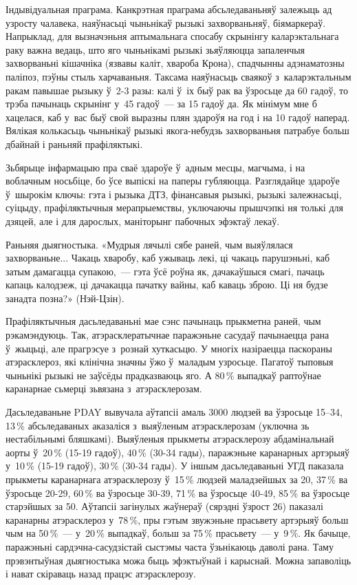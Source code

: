 Індывідуальная праграма. Канкрэтная праграма абсьледаваньняў залежыць ад узросту чалавека, наяўнасьці чыньнікаў рызыкі захворваньняў, біямаркераў. Напрыклад, для вызначэньня аптымальнага спосабу скрынінгу каларэктальнага раку важна ведаць, што яго чыньнікамі рызыкі зьяўляюцца запаленчыя захворваньні кішачніка (язвавы каліт, хвароба Крона), спадчынны адэнаматозны паліпоз, пэўны стыль харчаваньня. Таксама наяўнасьць сваякоў з~каларэктальным ракам павышае рызыку ў~2-3 разы: калі ў~іх быў рак ва ўзросьце да 60 гадоў, то трэба пачынаць скрынінг у~45 гадоў~--- за 15 гадоў да. Як мінімум мне б хацелася, каб у~вас быў свой выразны плян здароўя на год і на 10 гадоў наперад. Вялікая колькасьць чыньнікаў рызыкі якога-небудзь захворваньня патрабуе больш дбайнай і раньняй прафіляктыкі.

Зьбярыце інфармацыю пра сваё здароўе ў~адным месцы, магчыма, і на воблачным носьбіце, бо ўсе выпіскі на паперы губляюцца. Разглядайце здароўе ў~шырокім ключы: гэта і рызыка ДТЗ, фінансавыя рызыкі, рызыкі залежнасьці, суіцыду, прафіляктычныя мерапрыемствы, уключаючы прышчэпкі ня толькі для дзяцей, але і для дарослых, маніторынг пабочных эфэктаў лекаў.

Раньняя дыягностыка. «Мудрыя лячылі сябе раней, чым выяўлялася захворваньне... Чакаць хваробу, каб ужываць лекі, ці чакаць парушэньні, каб затым дамагацца супакою,~--- гэта ўсё роўна як, дачакаўшыся смагі, пачаць капаць калодзеж, ці дачакацца пачатку вайны, каб каваць зброю. Ці ня будзе занадта позна?» (Нэй-Цзін).

Прафіляктычныя дасьледаваньні мае сэнс пачынаць прыкметна раней, чым рэкамэндуюць. Так, атэрасклератычнае паражэньне сасудаў пачынаецца рана ў~жыцьці, але прагрэсуе з~рознай хуткасьцю. У многіх назіраецца паскораны атэрасклероз, які клінічна значны ўжо ў~маладым узросьце. Пагатоў тыповыя чыньнікі рызыкі не заўсёды прадказваюць яго. А 80\,\% выпадкаў раптоўнае каранарнае сьмерці зьвязана з~атэрасклерозам.

Дасьледаваньне PDAY вывучала аўтапсіі амаль 3000 людзей ва ўзросьце 15--34, 13\,\% абсьледаваных аказаліся з~выяўленым атэрасклерозам (уключна зь нестабільнымі бляшкамі). Выяўленыя прыкметы атэрасклерозу абдамінальнай аорты ў~20\,\% (15-19 гадоў), 40\,\% (30-34 гады), паражэньне каранарных артэрыяў у~10\,\% (15-19 гадоў), 30\,\% (30-34 гады). У іншым дасьледаваньні УГД паказала прыкметы каранарнага атэрасклерозу ў~15\,\% людзей маладзейшых за 20, 37\,\% ва ўзросьце 20-29, 60\,\% ва ўзросьце 30-39, 71\,\% ва ўзросьце 40-49, 85\,\% ва ўзросьце старэйшых за 50. Аўтапсіі загінулых жаўнераў (сярэдні ўзрост 26) паказалі каранарны атэрасклероз у~78\,\%, пры гэтым звужэньне прасьвету артэрыяў больш чым на 50\,\%~--- у~20\,\% выпадкаў, больш за 75\,\% прасьвету~--- у~9\,\%. Як бачыце, паражэньні сардэчна-сасудзістай сыстэмы часта ўзьнікаюць даволі рана. Таму прэвэнтыўная дыягностыка можа быць эфэктыўнай і карыснай. Можна запаволіць і нават скіраваць назад працэс атэрасклерозу.

